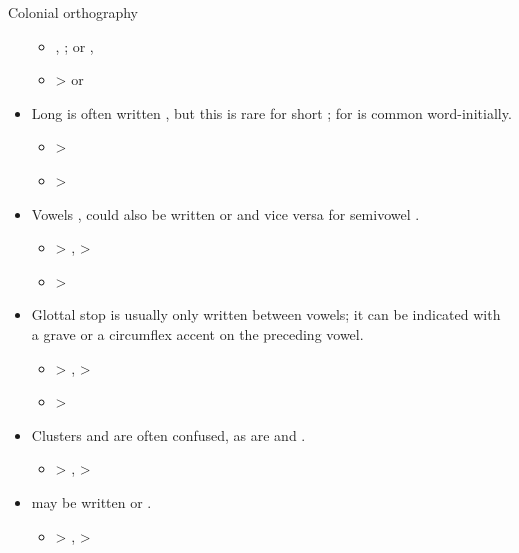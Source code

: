 \begin{frame}
\begin{columns}[t]
\begin{column}{.23\linewidth}
\begin{block}{Colonial orthography}
\begin{itemize}
\begin{itemize}
                \item  {} ,  ; or , 
                \item  {} >   or  
                \end{itemize}
        \item  Long  is often written , but this is rare for short ;  for  is common word-initially.
                \begin{itemize}
                \item {} >  
                \item {} >  
                \end{itemize}
        \item Vowels ,  could also be written  or  and vice versa for semivowel .
                \begin{itemize}
                \item {} >  ,  >  
                \item {} >  
                \end{itemize}
        \item Glottal stop  is usually only written between vowels; it can be indicated with  a grave or a circumflex accent on the preceding vowel.
                \begin{itemize}
                \item {} >  ,  >  
                \item {} >  
                \end{itemize}
        \item Clusters  and  are often confused, as are  and .
                \begin{itemize}
                \item {} >  ,  >  
                \end{itemize}
        \item {} may be written  or .
                \begin{itemize}
                \item {} >  ,  >  

\end{itemize}
\end{itemize}
\end{block}
\end{column}
\end{columns}
\end{frame}
